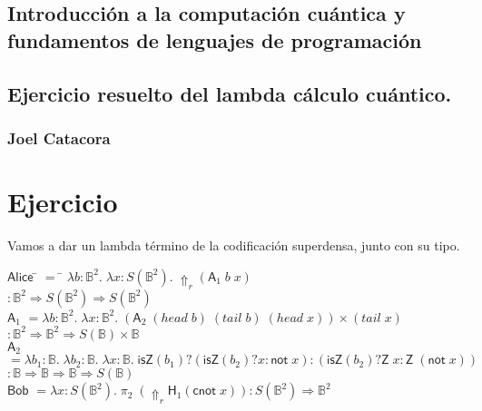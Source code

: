 \documentclass[a4paper,11pt]{article}
\title{}
\author{}
\begin{document}
\maketitle 

\thispagestyle{empty}
\begin{center}
\section*{Introducción a  la computación cuántica y fundamentos de lenguajes de programación} 
\subsection*{Ejercicio resuelto del lambda cálculo cuántico.}
\subsubsection*{Joel Catacora}

\end{center}

\newpage{\pagestyle{empty}\cleardoublepage}

\newpage

\section*
{Ejercicio}

Vamos a dar un lambda término de la codificación superdensa, junto con su tipo.

\begin{tabbing}
  $\textsf{Alice}$ \= $=$ \= $\lambda b : \mathds{B}^2. \; \lambda x : S(\mathds{B}^2). 
  \; \Uparrow_r (\textsf{A}_1 \; b \; x)$ \\
  
  \> \> $: \mathds{B}^2 \Rightarrow S(\mathds{B}^2) \Rightarrow S(\mathds{B}^2)$ \\

  $\textsf{A}_1$ \> $= \lambda b : \mathds{B}^2 . \; \lambda x : \mathds{B}^2. \; ( \textsf{A}_2 \; (head \; b) \; (tail \; b) \; (head \; x)) 
  \times (tail \; x)$ \\
  \> \> $: \mathds{B}^2 \Rightarrow \mathds{B}^2 \Rightarrow S(\mathds{B}) \times \mathds{B}$ \\
  
  $\textsf{A}_2$ \> $= \lambda b_1:\mathds{B}. \; \lambda b_2:\mathds{B}. \; \lambda x : \mathds{B}. \;
  \textsf{isZ}(b_1) ? (\textsf{isZ}(b_2) ? x : \textsf{not} \; x) : 
  (\textsf{isZ}(b_2) ? \textsf{Z} \; x : \textsf{Z} \; (\textsf{not} \; x))$ \\
  \> \> $: \mathds{B} \Rightarrow \mathds{B} \Rightarrow \mathds{B} \Rightarrow S(\mathds{B})$ \\ 

  $\textsf{Bob}$ \> $= \lambda x : S(\mathds{B}^2). \; \pi_{2} \; (\Uparrow_{r} \textsf{H}_{1} (\textsf{cnot} \; x)) 
  : S(\mathds{B}^2) \Rightarrow \mathds{B}^2$
\end{tabbing}
\end{document}
